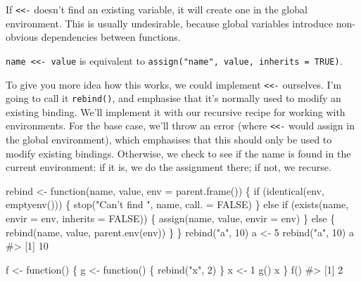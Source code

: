 \documentclass[oneside]{book}
\newenvironment{Shaded}{}{}
\newcommand{\KeywordTok} [1]{\textcolor[rgb]{0.00,0.44,0.13}{{#1}}}
\newcommand{\DataTypeTok}[1]{\textcolor[rgb]{0.56,0.13,0.00}{{#1}}}
\newcommand{\DecValTok}  [1]{\textcolor[rgb]{0.25,0.63,0.44}{{#1}}}
\newcommand{\StringTok}  [1]{\textcolor[rgb]{0.25,0.44,0.63}{{#1}}}
\newcommand{\CommentTok} [1]{\textcolor[rgb]{0.38,0.63,0.69}{{#1}}}
\newcommand{\OtherTok}   [1]{\textcolor[rgb]{0.00,0.44,0.13}{{#1}}}
\newcommand{\NormalTok}  [1]{{#1}}
\begin{document}
If \texttt{\textless{}\textless{}-} doesn't find an existing variable,
it will create one in the global environment. This is usually
undesirable, because global variables introduce non-obvious dependencies
between functions.

\texttt{name \textless{}\textless{}- value} is equivalent to
\texttt{assign("name", value, inherits = TRUE)}.

To give you more idea how this works, we could implement
\texttt{\textless{}\textless{}-} ourselves. I'm going to call it
\texttt{rebind()}, and emphasise that it's normally used to modify an
existing binding. We'll implement it with our recursive recipe for
working with environments. For the base case, we'll throw an error
(where \texttt{\textless{}\textless{}-} would assign in the global
environment), which emphasises that this should only be used to modify
existing bindings. Otherwise, we check to see if the name is found in
the current environment: if it is, we do the assignment there; if not,
we recurse.

\begin{Shaded}
\begin{Highlighting}[]
\NormalTok{rebind <-}\StringTok{ }\NormalTok{function(name, value, }\DataTypeTok{env =} \KeywordTok{parent.frame}\NormalTok{()) \{}
  \NormalTok{if (}\KeywordTok{identical}\NormalTok{(env, }\KeywordTok{emptyenv}\NormalTok{())) \{}
    \KeywordTok{stop}\NormalTok{(}\StringTok{"Can't find "}\NormalTok{, name, }\DataTypeTok{call. =} \OtherTok{FALSE}\NormalTok{)}
  \NormalTok{\} else if (}\KeywordTok{exists}\NormalTok{(name, }\DataTypeTok{envir =} \NormalTok{env, }\DataTypeTok{inherits =} \OtherTok{FALSE}\NormalTok{)) \{}
    \KeywordTok{assign}\NormalTok{(name, value, }\DataTypeTok{envir =} \NormalTok{env)}
  \NormalTok{\} else \{}
    \KeywordTok{rebind}\NormalTok{(name, value, }\KeywordTok{parent.env}\NormalTok{(env))}
  \NormalTok{\}}
\NormalTok{\}}
\KeywordTok{rebind}\NormalTok{(}\StringTok{"a"}\NormalTok{, }\DecValTok{10}\NormalTok{)}
\NormalTok{a <-}\StringTok{ }\DecValTok{5}
\KeywordTok{rebind}\NormalTok{(}\StringTok{"a"}\NormalTok{, }\DecValTok{10}\NormalTok{)}
\NormalTok{a}
\CommentTok{#> [1] 10}

\NormalTok{f <-}\StringTok{ }\NormalTok{function() \{}
  \NormalTok{g <-}\StringTok{ }\NormalTok{function() \{}
    \KeywordTok{rebind}\NormalTok{(}\StringTok{"x"}\NormalTok{, }\DecValTok{2}\NormalTok{)}
  \NormalTok{\}}
  \NormalTok{x <-}\StringTok{ }\DecValTok{1}
  \KeywordTok{g}\NormalTok{()}
  \NormalTok{x}
\NormalTok{\}}
\KeywordTok{f}\NormalTok{()}
\CommentTok{#> [1] 2}
\end{Highlighting}
\end{Shaded}
\end{document}
